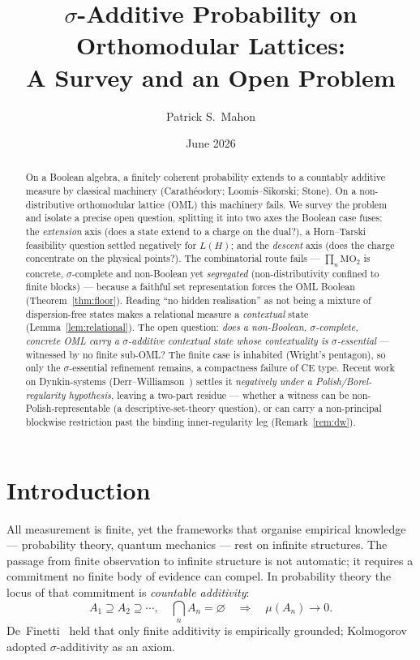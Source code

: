 \documentclass[11pt,reqno]{amsart}
\title[$\sigma$-Additive Probability on Orthomodular Lattices]
  {$\sigma$-Additive Probability on Orthomodular Lattices:\\
   A Survey and an Open Problem}
\author{Patrick S.\ Mahon}
\date{June 2026}
\theoremstyle{plain}
\theoremstyle{definition}
\theoremstyle{remark}
\begin{document}
\begin{abstract}
On a Boolean algebra, a finitely coherent probability extends to a countably
additive measure by classical machinery (Carath\'{e}odory; Loomis--Sikorski; Stone).
On a non-distributive orthomodular lattice (OML) this machinery fails. We survey
the problem and isolate a precise open question, splitting it into two axes the
Boolean case fuses: the \emph{extension} axis (does a state extend to a charge on the
dual?), a Horn--Tarski feasibility question settled negatively for $L(H)$; and the
\emph{descent} axis (does the charge concentrate on the physical points?). The
combinatorial route fails --- $\prod_n\mathrm{MO}_2$ is concrete, $\sigma$-complete
and non-Boolean yet \emph{segregated} (non-distributivity confined to finite blocks)
--- because a faithful set representation forces the OML Boolean
(Theorem~\ref{thm:floor}). Reading ``no hidden realisation'' as not being a mixture
of dispersion-free states makes a relational measure a \emph{contextual} state
(Lemma~\ref{lem:relational}). The open question: \emph{does a non-Boolean,
$\sigma$-complete, concrete OML carry a $\sigma$-additive contextual state whose
contextuality is $\sigma$-essential} --- witnessed by no finite sub-OML? The finite
case is inhabited (Wright's pentagon), so only the $\sigma$-essential refinement
remains, a compactness failure of CE type. Recent work on Dynkin-systems
(Derr--Williamson~\cite{DerrWilliamson2023}) settles it \emph{negatively under a
Polish/Borel-regularity hypothesis}, leaving a two-part residue --- whether a
witness can be non-Polish-representable (a descriptive-set-theory question), or
can carry a non-principal blockwise restriction past the binding
inner-regularity leg (Remark~\ref{rem:dw}).
\end{abstract}

\maketitle

\section{Introduction}
\label{sec:intro}

All measurement is finite, yet the frameworks that organise empirical
knowledge --- probability theory, quantum mechanics --- rest on infinite
structures. The passage from finite observation to infinite structure is
not automatic; it requires a commitment no finite body of evidence can
compel. In probability theory the locus of that commitment is
\emph{countable additivity}:
\[
  A_1 \supseteq A_2 \supseteq \cdots, \quad \bigcap_n A_n = \varnothing
  \quad\Longrightarrow\quad \mu(A_n) \to 0.
\]
De~Finetti~\cite{deFinetti1974} held that only finite additivity is
empirically grounded; Kolmogorov~\cite{Kolmogorov} adopted
$\sigma$-additivity as an axiom.
\end{document}

